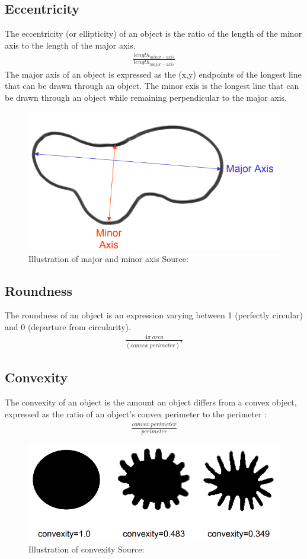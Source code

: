 \documentclass[letterpaper]{article}
\begin{document}
{\subsection{Eccentricity}
The eccentricity (or ellipticity) of an object is the ratio of the length of the minor axis to the length of the major axis. 
\begin{eqnarray*}
\frac {length_{minor-axis}} {length_{major-axis}}
\end{eqnarray*}
The major axis of an object is expressed as the (x,y) endpoints of the longest line that can be drawn through an object. The minor exis is the longest line that can be drawn through an object while remaining perpendicular to the major axis. \cite{Wirth2004-li}
\begin{figure}[H]
	\centering
	\includegraphics[width=0.4\linewidth]{./figures/major-minor-axis.png}
	\caption{Illustration of major and minor axis Source: \cite{Wirth2004-l} }
	\label{fig:major-minor}
\end{figure}

\subsection{Roundness}
The roundness of an object is an expression varying between 1 (perfectly circular) and 0 (departure from circularity).
\begin{eqnarray*}
\frac {4 \pi\ area} {(convex\ perimeter)^2}
\end{eqnarray*}


\subsection{Convexity}
The convexity of an object is the amount an object differs from a convex object, expressed as the ratio of an object's convex perimeter to the perimeter \cite{Wirth2004-li}:
\begin{eqnarray*}
\frac {convex\ perimeter} {perimeter}
\end{eqnarray*}
\begin{figure}[H]
	\centering
	\includegraphics[width=0.4\linewidth]{./figures/convexity.png}
	\caption{Illustration of convexity Source: \cite{Wirth2004-l} }
	\label{fig:circularity}
\end{figure}

}
\end{document}

